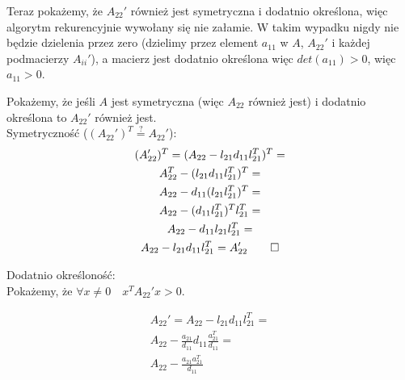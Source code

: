 \documentclass[a4paper]{article}
\begin{document}
\begin{enumerate}[label=(\alph*)]
                Teraz pokażemy, że $A_{22}'$ również jest symetryczna i dodatnio określona,
                więc algorytm rekurencyjnie wywołany się nie załamie.
                W takim wypadku nigdy nie będzie dzielenia przez zero
                (dzielimy przez element $a_{11}$ w $A$, $A_{22}'$ i każdej podmacierzy $A_{ii}'$),
                a macierz jest dodatnio określona więc $det(a_{11}) > 0$, więc $a_{11} > 0$.

                Pokażemy, że jeśli $A$ jest symetryczna (więc $A_{22}$ również jest)
                i dodatnio określona to $A_{22}'$ również jest. \\

                Symetryczność ($(A_{22}')^{T} \stackrel{?}{=} A_{22}'$):
                \begin{gather*}
                    (A_{22}')^{T} = (A_{22} - l_{21} d_{11} l_{21}^{T})^T = \\
                    A_{22}^{T} - (l_{21} d_{11} l_{21}^{T})^{T} = \\
                    A_{22} - d_{11} (l_{21} l_{21}^{T})^{T} = \\
                    A_{22} - (d_{11} l_{21}^{T})^{T} l_{21}^{T} = \\
                    A_{22} - d_{11} l_{21} l_{21}^{T} = \\
                    A_{22} - l_{21} d_{11} l_{21}^{T} = A_{22}' \qed
                \end{gather*}

                Dodatnio określoność: \\
                Pokażemy, że $\forall x \neq 0 \quad x^{T} A_{22}' x > 0$.

                \begin{gather*}
                    A_{22}' = A_{22} - l_{21} d_{11} l_{21}^{T} = \\
                    A_{22} - \frac{a_{21}}{d_{11}} d_{11}\frac{a_{21}^{T}}{d_{11}} = \\
                    A_{22} - \frac{a_{21} a_{21}^{T}}{d_{11}} \\
                \end{gather*}


\end{enumerate}
\end{document}
